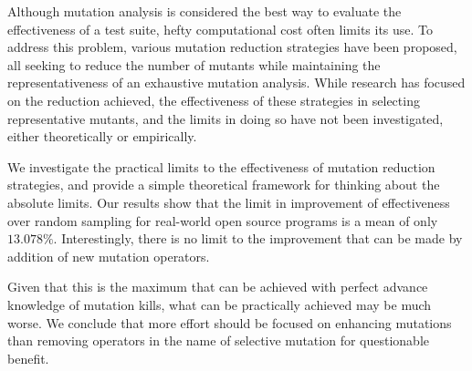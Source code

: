 Although mutation analysis is considered the best way to evaluate the
effectiveness of a test suite, hefty computational cost often limits its use.
To address this problem, various mutation reduction strategies have been
proposed, all seeking to reduce the number of mutants
while maintaining the representativeness of an exhaustive mutation analysis.
While research has focused on the reduction achieved, the effectiveness of
these strategies in selecting representative mutants, and the limits in doing
so have not been investigated, either theoretically or empirically.

We investigate the practical limits to the effectiveness of mutation reduction
strategies, and provide a simple theoretical framework for thinking about the
absolute limits. Our results show that the limit in improvement of effectiveness
over random sampling for real-world open source programs is a mean of
only $13.078\%$.
Interestingly, there is no limit to the improvement that can be made by
addition of new mutation operators.

Given that this is the maximum that can be achieved with perfect advance
knowledge of mutation kills, what can be practically achieved may be much
worse. We conclude that more effort should be focused on enhancing mutations
than removing operators in the name of selective mutation for questionable
benefit.

